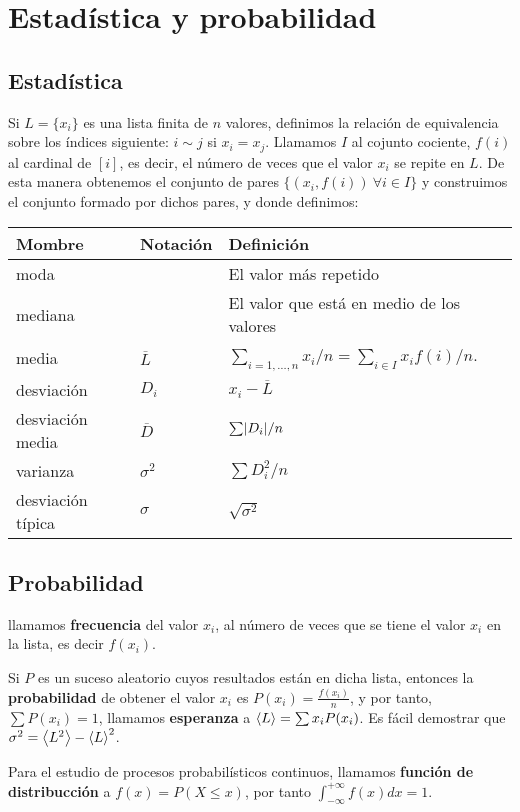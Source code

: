 \section{Estadística y probabilidad}
\subsection{Estadística}
Si $L=\{x_i\}$ es una lista finita de $n$ valores, definimos la relación de equivalencia sobre los índices siguiente: $i\sim j$ si $x_i = x_j$. Llamamos $I$ al cojunto cociente, $f(i)$ al cardinal de $[i]$, es decir, el número de veces que el valor $x_i$ se repite en $L$. De esta manera obtenemos el conjunto de pares $\{(x_i, f(i))\ \forall i\in I\}$ y construimos el conjunto formado por dichos pares, y donde  definimos:

\begin{tabular}{l|l|l}
	Mombre & Notación & Definición \\
	\hline
	moda & & El valor más repetido \\
	mediana & & El valor que está en medio de los valores \\
	media & $\overline{L}$ & $\sum_{i=1,\dots,n} x_i/n=\sum_{i\in I}x_if(i)/n$. \\
	desviación & $D_i$ & $x_i-\overline{L}$ \\
	desviación media & $\overline{D}$ & $\sum\lvert D_i\rvert/n$ \\
	varianza & $\sigma^2$ & $\sum D_i^2/n$ \\
	desviación típica & $\sigma$ & $\sqrt{\sigma^2}$\\
\end{tabular}

\subsection{Probabilidad}
llamamos \textbf{frecuencia} del valor $x_i$, al número de veces que se tiene el valor $x_i$ en la lista, es decir $f(x_i)$.

Si $P$ es un suceso aleatorio cuyos resultados están en dicha lista, entonces la \textbf{probabilidad} de obtener el valor $x_i$ es $P(x_i)=\frac{f(x_i)}{n}$, y por tanto, $\sum P(x_i) = 1$, llamamos \textbf{esperanza} a $\left\langle L\right\rangle = \sum x_iP(x_i)$. Es fácil demostrar que $\sigma^2 = \left\langle L^2\right\rangle-\left\langle L\right\rangle^2$.

Para el estudio de procesos probabilísticos continuos, llamamos \textbf{función de distribucción} a $f(x) = P(X\leq x)$, por tanto $\int_{-\infty}^{+\infty}f(x)dx=1$.
